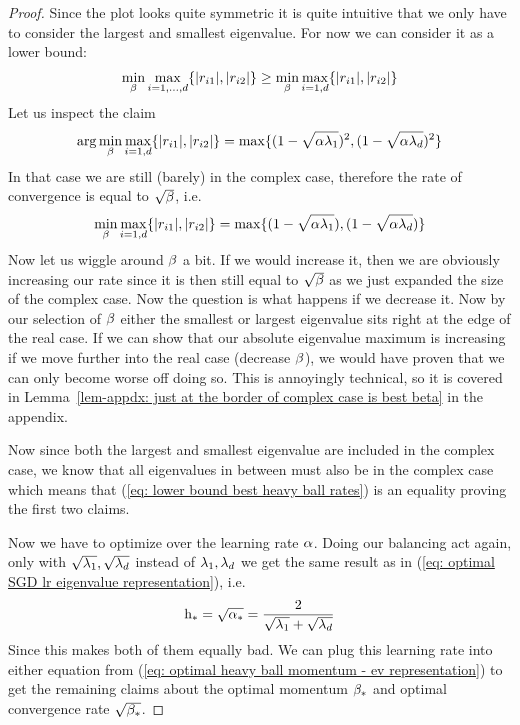 \begin{proof}
	Since the plot looks quite symmetric it is quite intuitive that
	we only have to consider the largest and smallest eigenvalue. For now we
	can consider it as a lower bound:
	\begin{align}\label{eq: lower bound best heavy ball rates}
		\min_{\beta}\max_{i=1,\dots,d}\{|r_{i1}|,|r_{i2}|\}
		\ge \min_{\beta}
		\max_{i=1,d}\{|r_{i1}|,|r_{i2}|\}
	\end{align}
	Let us inspect the claim
	\begin{align}\label{eq: optimal heavy ball momentum - ev representation}
		\arg\min_{\beta}\max_{i=1,d}\{|r_{i1}|,|r_{i2}|\}
		= \max\{(1-\sqrt{\alpha\lambda_1})^2, (1-\sqrt{\alpha\lambda_d})^2\}
	\end{align}
	In that case we are still (barely) in the complex case, therefore the rate
	of convergence is equal to \(\sqrt{\beta}\), i.e.
	\begin{align*}
		\min_{\beta}\max_{i=1,d}\{|r_{i1}|,|r_{i2}|\}
		= \max\{(1-\sqrt{\alpha\lambda_1}), (1-\sqrt{\alpha\lambda_d})\}
	\end{align*}
	Now let us wiggle around \(\beta\) a bit. If we would increase it, then
	we are obviously increasing our rate since it is then still equal to
	\(\sqrt{\beta}\) as we just expanded the size of the complex case. Now the
	question is what happens if we decrease it. Now by our selection of \(\beta\)
	either the smallest or largest eigenvalue sits right at the edge of the real 
	case. If we can show that our absolute eigenvalue maximum is increasing if
	we move further into the real case (decrease \(\beta\)), we would have
	proven that we can only become worse off doing so. This is annoyingly technical,
	so it is covered in Lemma~\ref{lem-appdx: just at the border of complex case is
	best beta} in the appendix.

	Now since both the largest and smallest eigenvalue are included in the complex
	case, we know that all eigenvalues in between must also be in the complex case
	which means that (\ref{eq: lower bound best heavy ball rates}) is an equality
	proving the first two claims.

	Now we have to optimize over the learning rate \(\alpha\). Doing our balancing
	act again, only with \(\sqrt{\lambda_1},\sqrt{\lambda_d}\) instead
	of \(\lambda_1,\lambda_d\) we get the same result as in
	(\ref{eq: optimal SGD lr eigenvalue representation}), i.e.
	\begin{align*}
		\text{h}_* = \sqrt{\alpha_*} = \frac{2}{\sqrt{\lambda_1}+\sqrt{\lambda_d}}
	\end{align*}
	Since this makes both of them equally bad. We can plug this learning rate into
	either equation from (\ref{eq: optimal heavy ball momentum - ev representation})
	to get the remaining claims about the optimal momentum \(\beta_*\) and optimal
	convergence rate \(\sqrt{\beta_*}\).
\end{proof}

